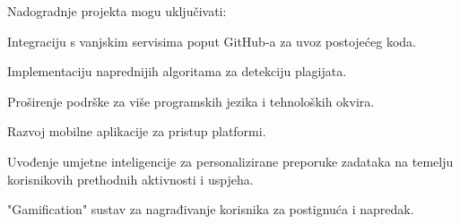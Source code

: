 		Nadogradnje projekta mogu uključivati:
		\begin{packed_item}
			\item Integraciju s vanjskim servisima poput GitHub-a za uvoz postojećeg koda.
			\item Implementaciju naprednijih algoritama za detekciju plagijata.
			\item Proširenje podrške za više programskih jezika i tehnoloških okvira.
			\item Razvoj mobilne aplikacije za pristup platformi.
			\item Uvođenje umjetne inteligencije za personalizirane preporuke zadataka
			na temelju korisnikovih prethodnih aktivnosti i uspjeha.
			\item "Gamification" sustav za nagrađivanje korisnika za postignuća i napredak.
		\end{packed_item}


		\eject
		
		
	